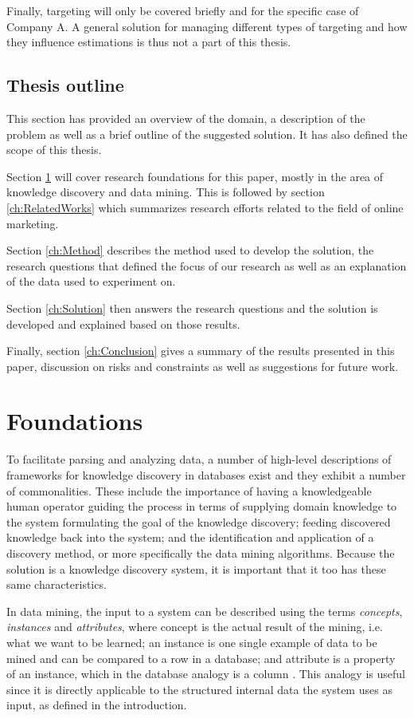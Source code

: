 \documentclass{sig-alternate}
\begin{document}
Finally, targeting will only be covered briefly and for the specific case of Company A. A general solution for managing different types of targeting and how they influence estimations is thus not a part of this thesis.

\subsection{Thesis outline}
This section has provided an overview of the domain, a description of the problem as well as a brief outline of the suggested solution. It has also defined the scope of this thesis.

Section \ref{ch:Foundations} will cover research foundations for this paper, mostly in the area of knowledge discovery and data mining. This is followed by section \ref{ch:RelatedWorks} which summarizes research efforts related to the field of online marketing.

Section \ref{ch:Method} describes the method used to develop the solution, the research questions that defined the focus of our research as well as an explanation of the data used to experiment on.

Section \ref{ch:Solution} then answers the research questions and the solution is developed and explained based on those results.

Finally, section \ref{ch:Conclusion} gives a summary of the results presented in this paper, discussion on risks and constraints as well as suggestions for future work.

\section{Foundations}
\label{ch:Foundations}
To facilitate parsing and analyzing data, a number of high-level descriptions of frameworks for knowledge discovery in databases exist \citep{Fayyad1996, Frawley1992} and they exhibit a number of commonalities. These include the importance of having a knowledgeable human operator guiding the process in terms of supplying domain knowledge to the system formulating the goal of the knowledge discovery; feeding discovered knowledge back into the system; and the identification and application of a discovery method, or more specifically the data mining algorithms. Because the solution is a knowledge discovery system, it is important that it too has these same characteristics.

In data mining, the input to a system can be described using the terms \emph{concepts}, \emph{instances} and \emph{attributes}, where concept is the actual result of the mining, i.e. what we want to be learned; an instance is one single example of data to be mined and can be compared to a row in a database; and attribute is a property of an instance, which in the database analogy is a column \citep{Witten2011}. This analogy is useful since it is directly applicable to the structured internal data the system uses as input, as defined in the introduction.
\end{document}
